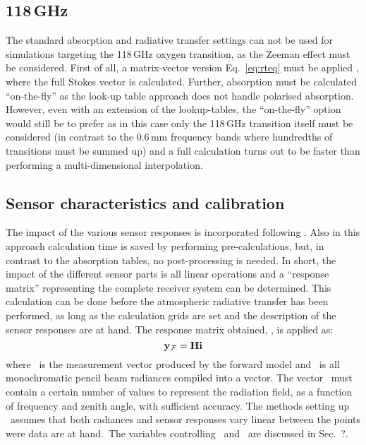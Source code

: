 \subsection{118\,GHz}
%
The standard absorption and radiative transfer settings can not be used for
simulations targeting the 118\,GHz oxygen transition, as the Zeeman effect must
be considered. First of all, a matrix-vector version Eq.~\ref{eq:rteq} must be
applied \citep{larsson:zeema:14}, where the full Stokes vector is calculated.
Further, absorption must be calculated ``on-the-fly'' as the look-up table
approach does not handle polarised absorption. However, even with an extension
of the lookup-tables, the ``on-the-fly'' option would still be to prefer as in
this case only the 118\,GHz transition itself must be considered (in contrast
to the 0.6\,mm frequency bands where hundredths of transitions must be summed
up) and a full calculation turns out to be faster than performing a
multi-dimensional interpolation.


\subsection{Sensor characteristics and calibration}
%
The impact of the various sensor responses is incorporated following
\citet{eriksson:06}. Also in this approach calculation time is saved by
performing pre-calculations, but, in contrast to the absorption tables, no
post-processing is needed. In short, the impact of the different sensor parts
is all linear operations and a ``response matrix'' representing the complete
receiver system can be determined. This calculation can be done before the
atmospheric radiative transfer has been performed, as long as the calculation
grids are set and the description of the sensor responses are at hand. The
response matrix obtained, \SnsMtr, is applied as:
\begin{equation}
  \label{eq:H}
  \mathbf{y}_{\mathcal{F}} = \mathbf{H}\mathbf{i}
\end{equation}
where \aMsrVct{\FrwMdl}\ is the measurement vector produced by the forward
model and \MpiVct\ is all monochromatic pencil beam radiances compiled into a
vector. The vector \MpiVct\ must contain a certain number of values to
represent the radiation field, as a function of frequency and zenith angle,
with sufficient accuracy. The methods setting up \SnsMtr\ assumes that both
radiances and sensor responses vary linear between the points were data are at
hand.\ The variables controlling
\SnsMtr\ and \MpiVct\ are discussed in Sec.~?.



